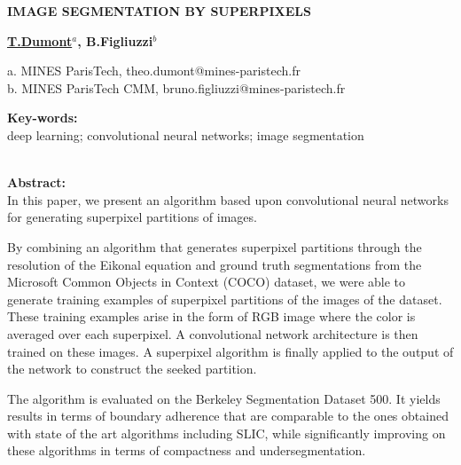 \documentclass{article}
\begin{document}
\begin{center}
    \begin{Large}\textbf{IMAGE SEGMENTATION BY SUPERPIXELS}\end{Large}

    \vspace{1cm}
    \begin{large}\textbf{\underline{T.Dumont$^a$}, B.Figliuzzi$^b$}\end{large}

    \vspace{0.5cm}
    a. MINES ParisTech, theo.dumont@mines-paristech.fr\\
    b. MINES ParisTech CMM, bruno.figliuzzi@mines-paristech.fr
    \vspace{1cm}
\end{center}

\begin{center}

\noindent\textbf{Key-words: }\\
deep learning; convolutional neural networks; image segmentation\\
\ \\
\end{center}
\textbf{Abstract: }\\
In this paper, we present an algorithm based upon convolutional neural networks for generating superpixel partitions of images.
\par
By combining an algorithm that generates superpixel partitions through the resolution of the Eikonal equation and ground truth segmentations from the Microsoft Common Objects in Context (COCO) dataset, we were able to generate training examples of superpixel partitions of the images of the dataset. These training examples arise in the form of RGB image where the color is averaged over each superpixel. A convolutional network architecture is then trained on these images. A superpixel algorithm is finally applied to the output of the network to construct the seeked partition.
\par
The algorithm is evaluated on the Berkeley Segmentation Dataset 500. It yields results in terms of boundary adherence that are comparable to the ones obtained with state of the art algorithms including SLIC, while significantly improving on these algorithms in terms of compactness and undersegmentation.
\end{document}
